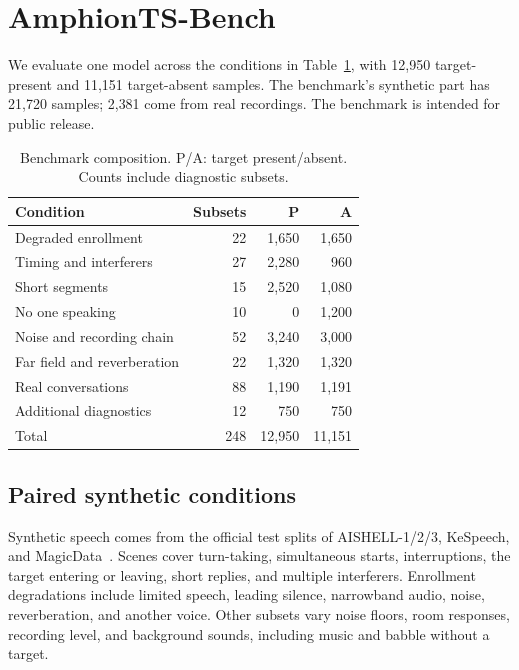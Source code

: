 \section{AmphionTS-Bench}
\label{sec:benchmark}
We evaluate one model across the conditions in Table~\ref{tab:composition}, with 12{,}950 target-present and 11{,}151 target-absent samples.
The benchmark's synthetic part has 21{,}720 samples; 2{,}381 come from real recordings.
The benchmark is intended for public release.

\begin{table}[t]
\caption{Benchmark composition. P/A: target present/absent. Counts include diagnostic subsets.}
\label{tab:composition}
\centering
\small
\begin{tabularx}{\columnwidth}{@{}Xrrr@{}}
\toprule
Condition & Subsets & P & A \\
\midrule
Degraded enrollment & 22 & 1{,}650 & 1{,}650 \\
Timing and interferers & 27 & 2{,}280 & 960 \\
Short segments & 15 & 2{,}520 & 1{,}080 \\
No one speaking & 10 & 0 & 1{,}200 \\
Noise and recording chain & 52 & 3{,}240 & 3{,}000 \\
Far field and reverberation & 22 & 1{,}320 & 1{,}320 \\
Real conversations & 88 & 1{,}190 & 1{,}191 \\
Additional diagnostics & 12 & 750 & 750 \\
\midrule
Total & 248 & 12{,}950 & 11{,}151 \\
\bottomrule
\end{tabularx}
\end{table}

\subsection{Paired synthetic conditions}
Synthetic speech comes from the official test splits of AISHELL-1/2/3, KeSpeech, and MagicData~\cite{bu2017aishell1,du2018aishell2,shi2021aishell3,tang2021kespeech}.
Scenes cover turn-taking, simultaneous starts, interruptions, the target entering or leaving, short replies, and multiple interferers.
Enrollment degradations include limited speech, leading silence, narrowband audio, noise, reverberation, and another voice.
Other subsets vary noise floors, room responses, recording level, and background sounds, including music and babble without a target.

